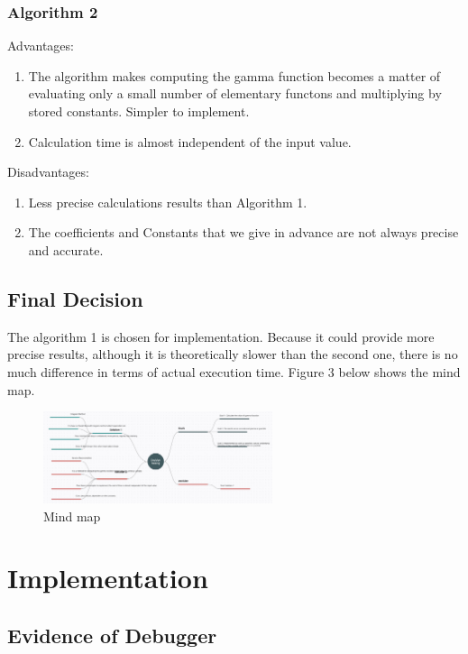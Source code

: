 \documentclass{report}
\begin{document}
\subsubsection{Algorithm 2}
Advantages:
\begin{enumerate}
\item The algorithm makes computing the gamma function becomes a matter of evaluating only a small number of elementary functons and multiplying by stored constants. Simpler to implement.
\item Calculation time is almost independent of the input value.
\end{enumerate}
Disadvantages:
\begin{enumerate}
\item Less precise calculations results than Algorithm 1.
\item The coefficients and Constants that we give in advance are not always precise and accurate.
\end{enumerate}

\subsection{Final Decision}
The algorithm 1 is chosen for implementation. Because it could provide more precise results, although it is theoretically slower than the second one, there is no much difference in terms of actual execution time. Figure 3 below shows the mind map.
\begin{figure}[H]
\centering
\includegraphics[width=0.60\textwidth]{mind map}
\caption{Mind map}
\end{figure}


\newpage
\section{Implementation}
\subsection{Evidence of Debugger}
\end{document}
